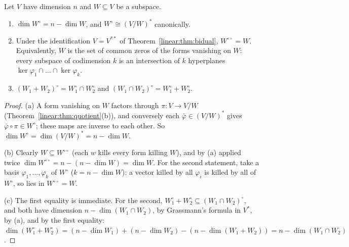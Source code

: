 \begin{theorem}[annihilators]\label{linear:thm:annihilator}
Let $V$ have dimension $n$ and $W\subseteq V$ be a subspace.
\begin{enumerate}[label=(\alph*)]
\item $\dim W^\circ=n-\dim W$, and $W^\circ\cong(V/W)^*$ canonically.
\item Under the identification $V=V^{**}$ of Theorem~\ref{linear:thm:bidual}, $W^{\circ\circ}=W$. Equivalently, $W$ is the set of
common zeros of the forms vanishing on $W$: every subspace of codimension $k$ is an intersection of $k$ hyperplanes
$\ker\varphi_1\cap\dots\cap\ker\varphi_k$.
\item $(W_1+W_2)^\circ=W_1^\circ\cap W_2^\circ$ and $(W_1\cap W_2)^\circ=W_1^\circ+W_2^\circ$.
\end{enumerate}
\end{theorem}
\begin{proof}
(a) A form vanishing on $W$ factors through $\pi:V\to V/W$ (Theorem~\ref{linear:thm:quotient}(b)), and conversely each
$\bar\varphi\in(V/W)^*$ gives $\bar\varphi\circ\pi\in W^\circ$; these maps are inverse to each other. So
$\dim W^\circ=\dim(V/W)^*=n-\dim W$.

(b) Clearly $W\subseteq W^{\circ\circ}$ (each $w$ kills every form killing $W$), and by (a) applied twice
$\dim W^{\circ\circ}=n-(n-\dim W)=\dim W$. For the second statement, take a basis $\varphi_1,\dots,\varphi_k$ of
$W^\circ$ ($k=n-\dim W$): a vector killed by all $\varphi_i$ is killed by all of $W^\circ$, so lies in $W^{\circ\circ}=W$.

(c) The first equality is immediate. For the second, $W_1^\circ+W_2^\circ\subseteq(W_1\cap W_2)^\circ$, and both have
dimension $n-\dim(W_1\cap W_2)$, by Grassmann's formula in $V^*$, by (a), and by the first equality:
$\dim(W_1^\circ+W_2^\circ)=(n-\dim W_1)+(n-\dim W_2)-(n-\dim(W_1+W_2))=n-\dim(W_1\cap W_2)$.
\end{proof}

